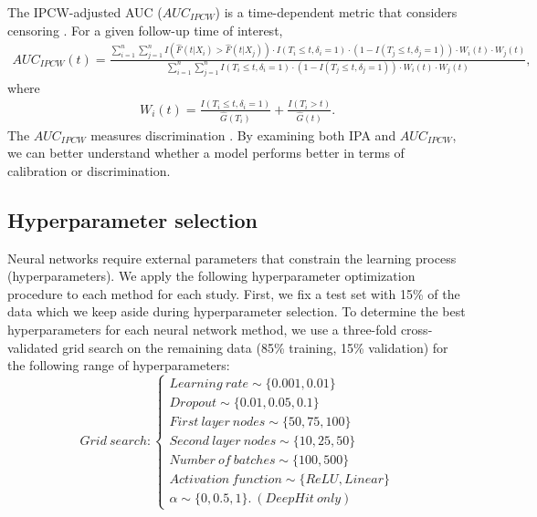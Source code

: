\documentclass[APA,LATO1COL]{WileyNJD-v2}
\begin{document}
The IPCW-adjusted AUC ($AUC_{IPCW}$) is a time-dependent metric that considers censoring \citep{auc}. For a given follow-up time of interest,
 \begin{align*}
AUC_{IPCW}(t)=\frac{\sum^{n}_{i=1}\sum^{n}_{j=1} I \left(\widehat{F}(t|X_{i})>\widehat{F}(t|X_{j})\right) \cdot I(T_{i}\leq t,\delta_{i}=1) \cdot \left( 1-I(T_{j}\leq t,\delta_{j}=1) \right) \cdot W_{i}(t) \cdot W_{j}(t)} { \sum^{n}_{i=1}\sum^{n}_{j=1} I(T_{i}\leq t,\delta_{i}=1) \cdot \left( 1-I(T_{j}\leq t,\delta_{j}=1) \right) \cdot W_{i}(t) \cdot W_{j}(t) },
\end{align*}where \begin{align*}
W_{i}(t)=\frac{I(T_{i}\leq t,\delta_{i}=1)}{\widehat{G}(T_{i})} +\frac{I(T_{i}>t)}{\widehat{G}(t)}.
\end{align*} The $AUC_{IPCW}$ measures discrimination \citep{auc}. By examining both IPA and $AUC_{IPCW}$,
we can better understand whether a model performs better in terms of calibration or discrimination.

\hypertarget{hyperparameter-selection}{%
\subsection{Hyperparameter selection}\label{hyperparameter-selection}}

Neural networks require external parameters that constrain the learning process (hyperparameters). We apply the following hyperparameter
optimization procedure to each method for each study. First, we fix a test set with 15\% of the data which we keep aside during hyperparameter selection.
To determine the best hyperparameters for each neural network method, we use a three-fold cross-validated grid search \citep{gulli2017} on the remaining
data (85\% training, 15\% validation) for the following range of hyperparameters:
\[
Grid\ search: \begin{cases}
Learning\ rate \sim \{0.001, 0.01\} \\ 
Dropout \sim \{0.01,0.05, 0.1\} \\
First\ layer\ nodes \sim \{50, 75, 100\} \\
Second\ layer\ nodes \sim \{10,25,50\} \\
Number\ of\ batches \sim \{100, 500\} \\
Activation\ function \sim \{ReLU, Linear\}\\
\alpha \sim \{0, 0.5, 1\}. \ (DeepHit \ only)
\end{cases}
\] 
\end{document}
